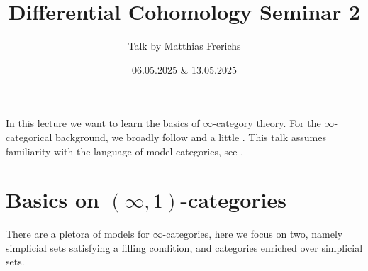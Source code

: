 \documentclass[10pt]{amsart}
\title{Differential Cohomology Seminar 2}
\date{06.05.2025 $\&$ 13.05.2025}
\author{Talk by Matthias Frerichs}
\numberwithin{equation}{section}
\begin{document}
\maketitle

In this lecture we want to learn the basics of $\infty$-category theory. For the $\infty$-categorical background, we broadly follow \cite{groth2010inftycats} and a little \cite{lurie2009htt}. This talk assumes familiarity with the language of model categories, see \cite{hirschhorn2003modelcategories}. 

\section{Basics on \texorpdfstring{$(\infty,1)$}{(oo,1)}-categories}

There are a pletora of models for $\infty$-categories, here we focus on two, namely simplicial sets satisfying a filling condition, and categories enriched over simplicial sets.
\end{document}
